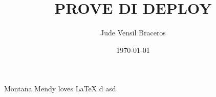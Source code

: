 \documentclass{article}
\title{PROVE DI DEPLOY}
\author{Jude Vensil Braceros}
\date{\today}
\begin{document}
\maketitle

Montana Mendy loves LaTeX d asd
\end{document}
